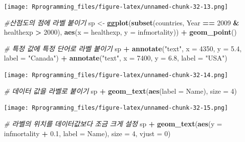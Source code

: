\documentclass[10pt,]{krantz}
\makeatletter
\newenvironment{Shaded}{\begin{snugshade}}{\end{snugshade}}
\newcommand{\KeywordTok}[1]{\textcolor[rgb]{0.13,0.29,0.53}{\textbf{#1}}}
\newcommand{\DataTypeTok}[1]{\textcolor[rgb]{0.13,0.29,0.53}{#1}}
\newcommand{\DecValTok}[1]{\textcolor[rgb]{0.00,0.00,0.81}{#1}}
\newcommand{\FloatTok}[1]{\textcolor[rgb]{0.00,0.00,0.81}{#1}}
\newcommand{\StringTok}[1]{\textcolor[rgb]{0.31,0.60,0.02}{#1}}
\newcommand{\CommentTok}[1]{\textcolor[rgb]{0.56,0.35,0.01}{\textit{#1}}}
\newcommand{\OperatorTok}[1]{\textcolor[rgb]{0.81,0.36,0.00}{\textbf{#1}}}
\newcommand{\NormalTok}[1]{#1}
\newenvironment{kframe}{%
\medskip{}
\setlength{\fboxsep}{.8em}
 \def\at@end@of@kframe{}%
 \ifinner\ifhmode%
  \def\at@end@of@kframe{\end{minipage}}%
  \begin{minipage}{\columnwidth}%
 \fi\fi%
 \def\FrameCommand##1{\hskip\@totalleftmargin \hskip-\fboxsep
 \colorbox{shadecolor}{##1}\hskip-\fboxsep
     \hskip-\linewidth \hskip-\@totalleftmargin \hskip\columnwidth}%
 \MakeFramed {\advance\hsize-\width
   \@totalleftmargin\z@ \linewidth\hsize
   \@setminipage}}%
 {\par\unskip\endMakeFramed%
 \at@end@of@kframe}
\renewenvironment{Shaded}{\begin{kframe}}{\end{kframe}}
\theoremstyle{definition}
\theoremstyle{definition}
\theoremstyle{remark}
\makeatother
\begin{document}
\texttt{[image: Rprogramming\_files/figure-latex/unnamed-chunk-32-13.png]}

\begin{Shaded}
\begin{Highlighting}[]


\CommentTok{#산점도의 점에 라벨 붙이기}
\NormalTok{sp <-}\StringTok{ }\KeywordTok{ggplot}\NormalTok{(}\KeywordTok{subset}\NormalTok{(countries, Year }\OperatorTok{==}\StringTok{ }\DecValTok{2009} \OperatorTok{&}\StringTok{ }\NormalTok{healthexp }\OperatorTok{>}\StringTok{ }\DecValTok{2000}\NormalTok{),}
             \KeywordTok{aes}\NormalTok{(}\DataTypeTok{x =}\NormalTok{ healthexp, }\DataTypeTok{y =}\NormalTok{ infmortality)) }\OperatorTok{+}\StringTok{ }\KeywordTok{geom_point}\NormalTok{()}

\CommentTok{# 특정 값에 특정 단어로 라벨 붙이기}
\NormalTok{sp }\OperatorTok{+}\StringTok{ }\KeywordTok{annotate}\NormalTok{(}\StringTok{"text"}\NormalTok{, }\DataTypeTok{x =} \DecValTok{4350}\NormalTok{, }\DataTypeTok{y =} \FloatTok{5.4}\NormalTok{, }\DataTypeTok{label =} \StringTok{"Canada"}\NormalTok{) }\OperatorTok{+}\StringTok{ }
\StringTok{  }\KeywordTok{annotate}\NormalTok{(}\StringTok{"text"}\NormalTok{, }\DataTypeTok{x =} \DecValTok{7400}\NormalTok{, }\DataTypeTok{y =} \FloatTok{6.8}\NormalTok{, }\DataTypeTok{label =} \StringTok{"USA"}\NormalTok{)}
\end{Highlighting}
\end{Shaded}

\texttt{[image: Rprogramming\_files/figure-latex/unnamed-chunk-32-14.png]}

\begin{Shaded}
\begin{Highlighting}[]


\CommentTok{# 데이터 값을 라벨로 붙이기}
\NormalTok{sp }\OperatorTok{+}\StringTok{ }\KeywordTok{geom_text}\NormalTok{(}\KeywordTok{aes}\NormalTok{(}\DataTypeTok{label =}\NormalTok{ Name), }\DataTypeTok{size =} \DecValTok{4}\NormalTok{)}
\end{Highlighting}
\end{Shaded}

\texttt{[image: Rprogramming\_files/figure-latex/unnamed-chunk-32-15.png]}

\begin{Shaded}
\begin{Highlighting}[]


\CommentTok{# 라벨의 위치를 데이터값보다 조금 크게 설정}
\NormalTok{sp }\OperatorTok{+}\StringTok{ }\KeywordTok{geom_text}\NormalTok{(}\KeywordTok{aes}\NormalTok{(}\DataTypeTok{y =}\NormalTok{ infmortality }\OperatorTok{+}\StringTok{ }\FloatTok{0.1}\NormalTok{, }\DataTypeTok{label =}\NormalTok{ Name), }\DataTypeTok{size =} \DecValTok{4}\NormalTok{, }\DataTypeTok{vjust =} \DecValTok{0}\NormalTok{)}
\end{Highlighting}
\end{Shaded}
\end{document}
